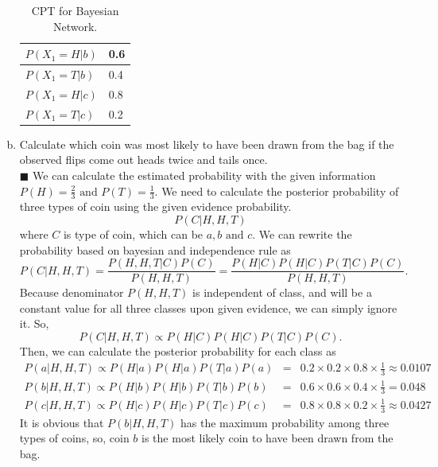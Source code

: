 \documentclass{article}
\newcommand{\solution}[1]{~\\ $\blacksquare$ \sffamily\upshape\selectfont #1
\normalfont ~\\~ }
\begin{document}
\begin{enumerate}[a.]
{\begin{table}[h]
\begin{tabular}{l|l}
      $P(X_1=H|b)$ & 0.6 \\ \midrule
      $P(X_1=T|b)$ & 0.4 \\ \midrule 
      $P(X_1=H|c)$ & 0.8 \\ \midrule 
      $P(X_1=T|c)$ & 0.2 \\
      \bottomrule
    \end{tabular}
    \caption{CPT for Bayesian Network.}
    \label{tbl:ai-hwk2-14-1}
  \end{table}
  }
\item Calculate which coin was most likely to have been drawn from the
  bag if the observed flips come out heads twice and tails once.
  \solution{
    We can calculate the estimated probability with the given
    information $P(H)=\frac{2}{3} \mbox{ and } P(T)=\frac{1}{3}$. We
    need to calculate the posterior probability of three types of coin
    using the given evidence probability. 
    \[ P(C|H,H,T) \] where $C$ is type of coin, which can be $a,b
    \mbox{ and } c$. We can rewrite the probability based on bayesian
    and independence rule as \[ P(C|H,H,T) = \frac{P(H,H,T|C)P(C)}{P(H,H,T)} =
    \frac{P(H|C)P(H|C)P(T|C)P(C)}{P(H,H,T)}. \]
    Because denominator $P(H,H,T)$ is independent of class, and will
    be a constant value for all three classes upon given evidence, we
    can simply ignore it. So, \[ P(C|H,H,T) \propto P(H|C)P(H|C)P(T|C)P(C). \]
    Then, we can calculate the posterior probability for each class as
    \begin{eqnarray*}
      P(a|H,H,T) \propto P(H|a)P(H|a)P(T|a)P(a) & = &
      0.2\times 0.2\times 0.8 \times \frac{1}{3} \approx 0.0107 \\
      P(b|H,H,T) \propto P(H|b)P(H|b)P(T|b)P(b) & = &
      0.6\times 0.6\times 0.4 \times \frac{1}{3} = 0.048 \\
      P(c|H,H,T) \propto P(H|c)P(H|c)P(T|c)P(c) & = &
      0.8\times 0.8\times 0.2 \times \frac{1}{3} \approx 0.0427 
    \end{eqnarray*}
    It is obvious that $P(b|H,H,T)$ has the maximum probability among
    three types of coins, so, coin $b$ is the most likely coin to have
    been drawn from the bag. 
  }
\end{enumerate}
\end{document}
